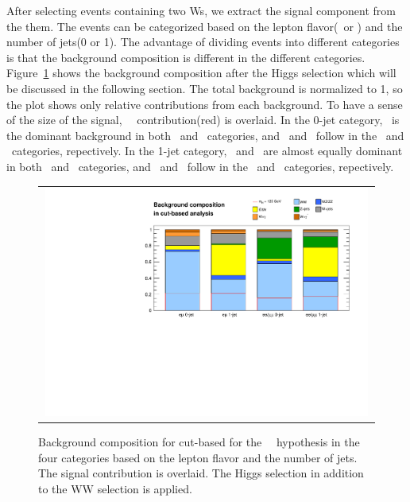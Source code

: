 

After selecting events containing two Ws, we extract the signal component 
from the them. The events can be categorized based on the lepton flavor(\DF\ or \SF)
and the number of jets(0 or 1). The advantage of dividing events 
into different categories is that the background composition is different
in the different categories. 
Figure~\ref{fig:bkgcomposition} shows the background composition
after the Higgs selection which will be discussed in the following section.
The total background is normalized to 1, so the plot shows only relative 
contributions from each background. To have a sense of the size of the signal, 
~\GeV\ contribution(red) is overlaid. 
In the 0-jet category, \ww\ is the dominant background in both \DF\ and \SF\ 
categories, and \Wjets\ and \dyll\ follow in the \DF\ and \SF\ categories,
repectively. 
In the 1-jet category, \ww\ and \topbkg\ are almost equally dominant in both \DF\ and \SF\
categories, and \Wjets\ and \dyll\ follow in the \DF\ and \SF\ categories,
repectively.
%
\begin{figure}[htp] 
\centering 
\begin{tabular}{c} 
\includegraphics[width=0.99\textwidth]{figures/Bkgcomposition_cutbased.pdf} 
\end{tabular} 
\caption{Background composition for cut-based for the ~\GeV\ hypothesis
in the four categories based on the lepton flavor and the number of jets. 
The signal contribution is overlaid. The Higgs selection in addition to the  
WW selection is applied.  
} 
\label{fig:bkgcomposition} 
\end{figure} 

